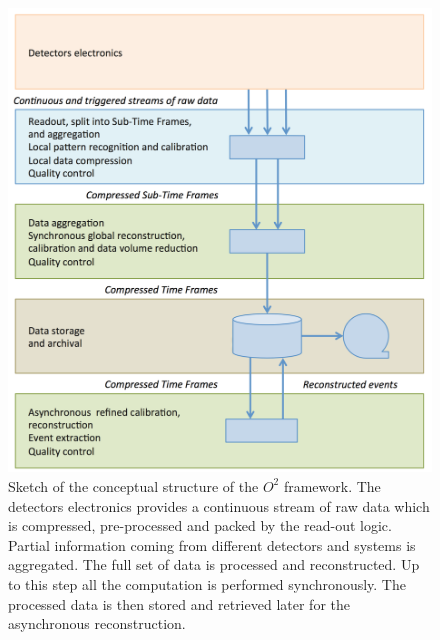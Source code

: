 \begin{figure}[!t]
\begin{center}
\includegraphics[width=0.95\linewidth]{Chapters/O2/Figs/O2.pdf}
\caption{Sketch of the conceptual structure of the $O^2$ framework. The detectors electronics provides a continuous stream of raw data which is compressed, pre-processed and packed by the read-out logic. Partial information coming from different detectors and systems is aggregated. The full set of data is processed and reconstructed. Up to this step all the computation is performed synchronously. The processed data is then stored and retrieved later for the asynchronous reconstruction.}
\label{fig:O2_sketch}
\end{center}
\end{figure}

